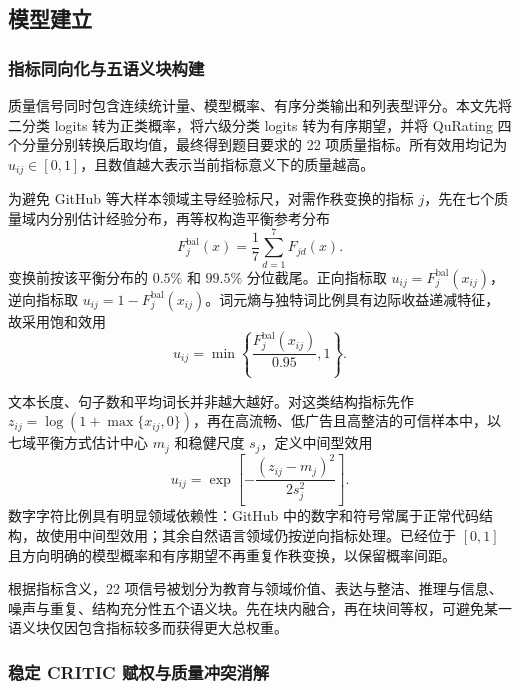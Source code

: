 \subsection{模型建立}

\subsubsection{指标同向化与五语义块构建}

质量信号同时包含连续统计量、模型概率、有序分类输出和列表型评分。本文先将二分类 logits 转为正类概率，将六级分类 logits 转为有序期望，并将 QuRating 四个分量分别转换后取均值，最终得到题目要求的 22 项质量指标。所有效用均记为 $u_{ij}\in[0,1]$，且数值越大表示当前指标意义下的质量越高。

为避免 GitHub 等大样本领域主导经验标尺，对需作秩变换的指标 $j$，先在七个质量域内分别估计经验分布，再等权构造平衡参考分布
\begin{equation}
F_j^{\mathrm{bal}}(x)=\frac{1}{7}\sum_{d=1}^{7}F_{jd}(x).
\label{eq:p1_balanced_cdf}
\end{equation}
变换前按该平衡分布的 $0.5\%$ 和 $99.5\%$ 分位截尾。正向指标取 $u_{ij}=F_j^{\mathrm{bal}}(x_{ij})$，逆向指标取 $u_{ij}=1-F_j^{\mathrm{bal}}(x_{ij})$。词元熵与独特词比例具有边际收益递减特征，故采用饱和效用
\begin{equation}
u_{ij}=\min\left\{\frac{F_j^{\mathrm{bal}}(x_{ij})}{0.95},1\right\}.
\label{eq:p1_saturating_utility}
\end{equation}

文本长度、句子数和平均词长并非越大越好。对这类结构指标先作 $z_{ij}=\log(1+\max\{x_{ij},0\})$，再在高流畅、低广告且高整洁的可信样本中，以七域平衡方式估计中心 $m_j$ 和稳健尺度 $s_j$，定义中间型效用
\begin{equation}
u_{ij}=\exp\left[-\frac{(z_{ij}-m_j)^2}{2s_j^2}\right].
\label{eq:p1_mid_utility}
\end{equation}
数字字符比例具有明显领域依赖性：GitHub 中的数字和符号常属于正常代码结构，故使用中间型效用；其余自然语言领域仍按逆向指标处理。已经位于 $[0,1]$ 且方向明确的模型概率和有序期望不再重复作秩变换，以保留概率间距。

根据指标含义，22 项信号被划分为教育与领域价值、表达与整洁、推理与信息、噪声与重复、结构充分性五个语义块。先在块内融合，再在块间等权，可避免某一语义块仅因包含指标较多而获得更大总权重。

\subsubsection{稳定 CRITIC 赋权与质量冲突消解}

